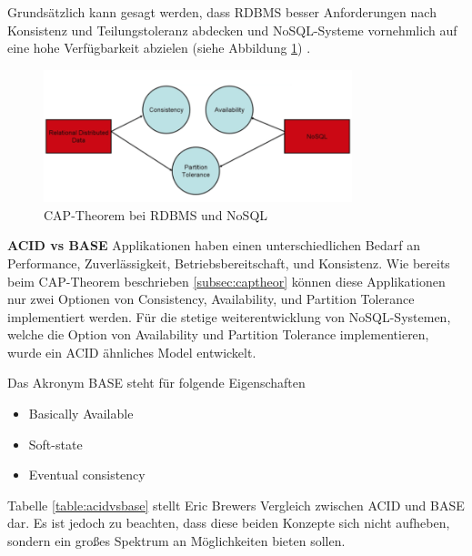 Grundsätzlich kann gesagt werden, dass RDBMS besser Anforderungen nach Konsistenz und Teilungstoleranz abdecken und NoSQL-Systeme vornehmlich auf eine hohe Verfügbarkeit abzielen (siehe Abbildung \ref{fig:captheor}) \cite{MELD.CH2-noSQL.capTheoremComp}.

\begin{figure}[!htb]\centering
	\includegraphics[width=0.8\textwidth]{images/capTheorem}
	\caption{CAP-Theorem bei RDBMS und NoSQL \cite{MELD.CH2-noSQL.capTheoremComp}}
	\label{fig:captheor}
\end{figure}

\clearpage

\label{subsec:acidvsbase}
\textbf{ACID vs BASE\newline}
Applikationen haben einen unterschiedlichen Bedarf an Performance, Zuverlässigkeit, Betriebsbereitschaft, und Konsistenz. Wie bereits beim CAP-Theorem beschrieben \ref{subsec:captheor} können diese Applikationen nur zwei Optionen von Consistency, Availability, und Partition Tolerance implementiert werden. Für die stetige weiterentwicklung von NoSQL-Systemen, welche die Option von Availability und Partition Tolerance implementieren, wurde ein ACID ähnliches Model entwickelt.

Das Akronym BASE steht für folgende Eigenschaften
\begin{itemize}
	\item Basically Available
	\item Soft-state
	\item Eventual consistency
\end{itemize}

Tabelle \ref{table:acidvsbase} stellt Eric Brewers Vergleich zwischen ACID und BASE dar. Es ist jedoch zu beachten, dass diese beiden Konzepte sich nicht aufheben, sondern ein großes Spektrum an Möglichkeiten bieten sollen. 

